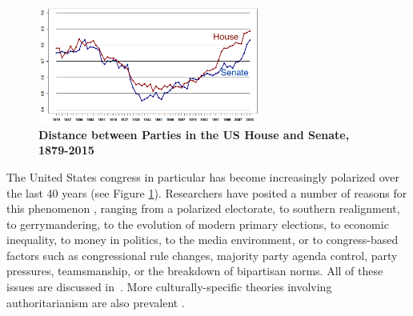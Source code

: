 \begin{figure}[htbp]
\begin{center}
\includegraphics[width=0.65\textwidth]{figs/polar_house_and_senate_46-115_july_11}
\caption{{\bf Distance between Parties in the US House and Senate, 1879-2015}}
\label{fig:uscongress}
\end{center}
\end{figure}

The United States congress in particular has become increasingly polarized over the last 40 years (see Figure \ref{fig:uscongress}).  
Researchers have posited a number of reasons for this phenomenon \cite{barber2015causes}\cite{poole1984polarization}, ranging from a polarized electorate, to southern realignment, to gerrymandering, to the evolution of modern primary elections, to economic inequality, to money in politics, to the media environment, or to congress-based factors such as congressional rule changes, majority party agenda control, party pressures, teamsmanship, or the breakdown of bipartisan norms.  All of these issues are discussed in~\cite{poole1984polarization}.
More culturally-specific theories involving authoritarianism are also prevalent \cite{hetherington2009authoritarianism}.






